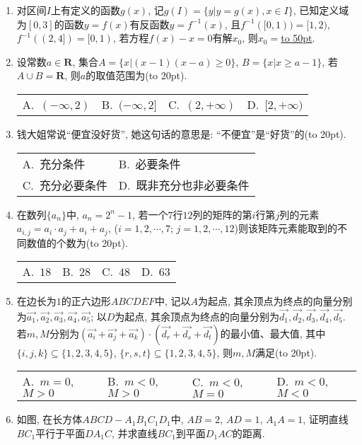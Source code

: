 \documentclass[10pt,a4paper]{article}
\newcommand{\blank}[1]{\underline{\hbox to #1pt{}}}
\newcommand{\bracket}[1]{(\hbox to #1pt{})}
\newcommand{\twoch}[4]{\par\begin{tabular}{p{.46\textwidth}p{.46\textwidth}}
A.~#1& B.~#2\\
C.~#3& D.~#4
\end{tabular}}
\newcommand{\fourch}[4]{\par\begin{tabular}{p{.23\textwidth}p{.23\textwidth}p{.23\textwidth}p{.23\textwidth}}
A.~#1 &B.~#2& C.~#3& D.~#4
\end{tabular}}
\begin{document}
\begin{enumerate}[1.]
\begin{center}
\end{center}
\item 对区间$I$上有定义的函数$g(x)$, 记$g(I)=\{y|y=g(x),x\in I\}$, 已知定义域为$[0,3]$的函数$y=f(x)$有反函数$y=f^{-1}(x)$, 且$f^{-1}([0,1))=[1,2)$, $f^{-1}((2,4])=[0,1)$, 若方程$f(x)-x=0$有解$x_0$, 则$x_0=$\blank{50}.
\item 设常数$a\in \mathbf{R}$, 集合$A=\{x|(x-1)(x-a)\ge 0\}$, $B=\{x|x\ge a-1\}$, 若$A\cup B=\mathbf{R}$, 则$a$的取值范围为\bracket{20}.
\fourch{$(-\infty ,2)$}{$(-\infty ,2]$}{$(2,+\infty)$}{$[2,+\infty)$}
\item 钱大姐常说``便宜没好货'', 她这句话的意思是: ``不便宜''是``好货''的\bracket{20}.
\twoch{充分条件}{必要条件}{充分必要条件}{既非充分也非必要条件}
\item 在数列$\{a_n\}$中, $a_n=2^n-1$, 若一个$7$行$12$列的矩阵的第$i$行第$j$列的元素$a_{i,j}=a_i\cdot a_j+a_i+a_j$, ($i=1,2,\cdots ,7$; $j=1,2,\cdots ,12$)则该矩阵元素能取到的不同数值的个数为\bracket{20}.
\fourch{$18$}{$28$}{$48$}{$63$}
\item 在边长为$1$的正六边形$ABCDEF$中, 记以$A$为起点, 其余顶点为终点的向量分别为$\overrightarrow{a_1},\overrightarrow{a_2},\overrightarrow{a_3},\overrightarrow{a_4},\overrightarrow{a_5}$; 以$D$为起点, 其余顶点为终点的向量分别为$\overrightarrow{d_1},\overrightarrow{d_2},\overrightarrow{d_3},\overrightarrow{d_4},\overrightarrow{d_5}$. 若$m,M$分别为$(\overrightarrow{a_i}+\overrightarrow{a_j}+\overrightarrow{a_k})\cdot (\overrightarrow{d_r}+\overrightarrow{d_s}+\overrightarrow{d_t})$的最小值、最大值, 其中$\{i,j,k\}\subseteq \{1,2,3,4,5\}$, $\{r,s,t\}\subseteq \{1,2,3,4,5\}$, 则$m,M$满足\bracket{20}.
\fourch{$m=0$, $M>0$}{$m<0$, $M>0$}{$m<0$, $M=0$}{$m<0$, $M<0$}
\item 如图, 在长方体$ABCD-A_1B_1C_1D_1$中, $AB=2$, $AD=1$, $A_1A=1$, 证明直线$BC_1$平行于平面$DA_1C$, 并求直线$BC_1$到平面$D_1AC$的距离.
\begin{center}
\begin{tikzpicture}[>=latex,scale = 2]

\end{tikzpicture}
\end{center}
\end{enumerate}
\end{document}
